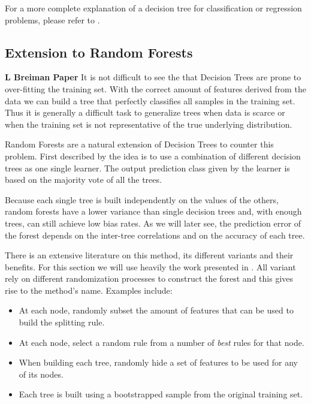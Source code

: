 \documentclass{article}%
\theoremstyle{definition}
\begin{document}
For a more complete explanation of a decision tree for classification or regression problems, please refer to \cite{breiman-cart84}.

\subsection{Extension to Random Forests}
\textbf{L Breiman Paper}
It is not difficult to see the that Decision Trees are prone to over-fitting the training set. With the correct amount of features derived from the data we can build a tree that perfectly classifies all samples in the training set. Thus it is generally a difficult task to generalize trees when data is scarce or when the training set is not representative of the true underlying distribution. 

Random Forests are a natural extension of Decision Trees to counter this problem. First described by \cite{HoFirstRandomForest} the idea is to use a combination of different decision trees as one single learner. The output prediction class given by the learner is based on the majority vote of all the trees.

Because each single tree is built independently on the values of the others, random forests have a lower variance than single decision trees and, with enough trees, can still achieve low bias rates. As we will later see, the prediction error of the forest depends on the inter-tree correlations and on the accuracy of each tree.

There is an extensive literature on this method, its different variants and their benefits. For this section we will use heavily the work presented in \cite{breiman-randomforests}. All variant rely on different randomization processes to construct the forest and this gives rise to the method's name. Examples include:
\begin{itemize}
	\item At each node, randomly subset the amount of features that can be used to build the splitting rule. 
	\item At each node, select a random rule from a number of \textit{best} rules for that node.
	\item When building each tree, randomly hide a set of features to be used for any of its nodes.
	\item Each tree is built using a bootstrapped sample from the original training set.
\end{itemize}
\end{document}
